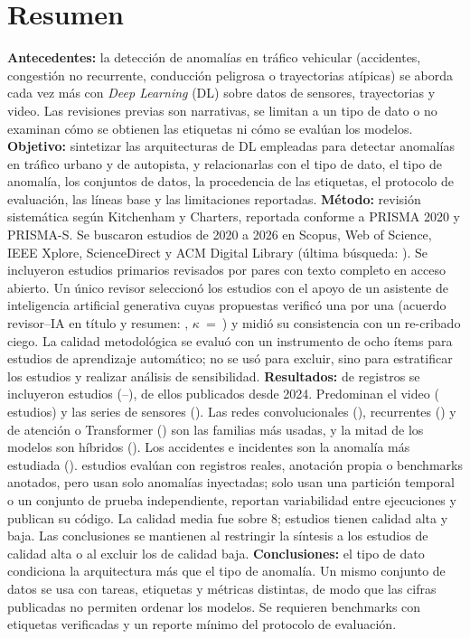 \documentclass[12pt, a4paper]{article}
\begin{document}
\section*{Resumen}
\textbf{Antecedentes:} la detección de anomalías en tráfico vehicular (accidentes, congestión no recurrente, conducción peligrosa o trayectorias atípicas) se aborda cada vez más con \textit{Deep Learning} (DL) sobre datos de sensores, trayectorias y video. Las revisiones previas son narrativas, se limitan a un tipo de dato o no examinan cómo se obtienen las etiquetas ni cómo se evalúan los modelos.
\textbf{Objetivo:} sintetizar las arquitecturas de DL empleadas para detectar anomalías en tráfico urbano y de autopista, y relacionarlas con el tipo de dato, el tipo de anomalía, los conjuntos de datos, la procedencia de las etiquetas, el protocolo de evaluación, las líneas base y las limitaciones reportadas.
\textbf{Método:} revisión sistemática según Kitchenham y Charters, reportada conforme a PRISMA 2020 y PRISMA-S. Se buscaron estudios de 2020 a 2026 en Scopus, Web of Science, IEEE Xplore, ScienceDirect y ACM Digital Library (última búsqueda: \FechaBusqueda). Se incluyeron estudios primarios revisados por pares con texto completo en acceso abierto. Un único revisor seleccionó los estudios con el apoyo de un asistente de inteligencia artificial generativa cuyas propuestas verificó una por una (acuerdo revisor--IA en título y resumen: \AcuerdoIATA, $\kappa$~=~\KappaIATA) y midió su consistencia con un re-cribado ciego. La calidad metodológica se evaluó con un instrumento de ocho ítems para estudios de aprendizaje automático; no se usó para excluir, sino para estratificar los estudios y realizar análisis de sensibilidad.
\textbf{Resultados:} de \Pidentificados{} registros se incluyeron \Nestudios{} estudios (\AnioMin--\AnioMax), \NrecientesVeintidosVeintiseis{} de ellos publicados desde 2024. Predominan el video (\NdatoVideo{} estudios) y las series de sensores (\NdatoSensores). Las redes convolucionales (\NfamConv), recurrentes (\NfamRec) y de atención o Transformer (\NfamTransf) son las familias más usadas, y la mitad de los modelos son híbridos (\Nhibrido). Los accidentes e incidentes son la anomalía más estudiada (\PcatA). \NetiqRealesTotal{} estudios evalúan con registros reales, anotación propia o benchmarks anotados, pero \NetiqInyect{} usan solo anomalías inyectadas; solo \STodosPartOK{} usan una partición temporal o un conjunto de prueba independiente, \Nvariabilidad{} reportan variabilidad entre ejecuciones y \NcodigoURL{} publican su código. La calidad media fue \QAmedia{} sobre 8; \NaltaCalidad{} estudios tienen calidad alta y \NbajaCalidad{} baja. Las conclusiones se mantienen al restringir la síntesis a los estudios de calidad alta o al excluir los de calidad baja.
\textbf{Conclusiones:} el tipo de dato condiciona la arquitectura más que el tipo de anomalía. Un mismo conjunto de datos se usa con tareas, etiquetas y métricas distintas, de modo que las cifras publicadas no permiten ordenar los modelos. Se requieren benchmarks con etiquetas verificadas y un reporte mínimo del protocolo de evaluación.
\end{document}
